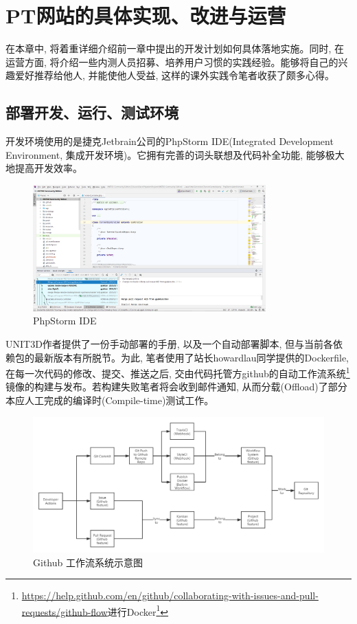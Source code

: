 \chapter{PT网站的具体实现、改进与运营}
\label{cha:experiment}

在本章中, 将着重详细介绍前一章中提出的开发计划如何具体落地实施。同时, 在运营方面, 将介绍一些内测人员招募、培养用户习惯的实践经验。能够将自己的兴趣爱好推荐给他人, 并能使他人受益, 这样的课外实践令笔者收获了颇多心得。

\section{部署开发、运行、测试环境}

开发环境使用的是捷克Jetbrain公司的PhpStorm IDE(Integrated Development Environment, 集成开发环境)。它拥有完善的词头联想及代码补全功能, 能够极大地提高开发效率。

\begin{figure}[ht]
    \centering
    \includegraphics[width=0.8\textwidth]{support-files/4.1-phpstorm-ide.png}
    \caption{PhpStorm IDE}
    \label{fig:phpstormide}
\end{figure}

UNIT3D作者提供了一份手动部署的手册, 以及一个自动部署脚本, 但与当前各依赖包的最新版本有所脱节。为此, 笔者使用了站长howardlau同学提供的Dockerfile, 在每一次代码的修改、提交、推送之后, 交由代码托管方github的自动工作流系统\footnote{\url{https://help.github.com/en/github/collaborating-with-issues-and-pull-requests/github-flow}进行Docker\footnote{https://www.docker.com/}}镜像的构建与发布。若构建失败笔者将会收到邮件通知, 从而分载(Offload)了部分本应人工完成的编译时(Compile-time)测试工作。

\begin{figure}[ht]
    \centering
    \includegraphics[width=\textwidth]{support-files/4.1-github-workflow.png}
    \caption{Github 工作流系统示意图}
    \label{fig:githubworkflow}
\end{figure}

